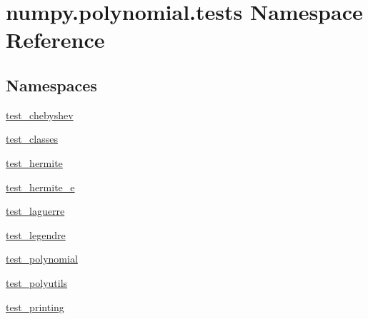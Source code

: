 \hypertarget{namespacenumpy_1_1polynomial_1_1tests}{}\section{numpy.\+polynomial.\+tests Namespace Reference}
\label{namespacenumpy_1_1polynomial_1_1tests}
\subsection*{Namespaces}
\begin{DoxyCompactItemize}
\item 
 \hyperlink{namespacenumpy_1_1polynomial_1_1tests_1_1test__chebyshev}{test\+\_\+chebyshev}
\item 
 \hyperlink{namespacenumpy_1_1polynomial_1_1tests_1_1test__classes}{test\+\_\+classes}
\item 
 \hyperlink{namespacenumpy_1_1polynomial_1_1tests_1_1test__hermite}{test\+\_\+hermite}
\item 
 \hyperlink{namespacenumpy_1_1polynomial_1_1tests_1_1test__hermite__e}{test\+\_\+hermite\+\_\+e}
\item 
 \hyperlink{namespacenumpy_1_1polynomial_1_1tests_1_1test__laguerre}{test\+\_\+laguerre}
\item 
 \hyperlink{namespacenumpy_1_1polynomial_1_1tests_1_1test__legendre}{test\+\_\+legendre}
\item 
 \hyperlink{namespacenumpy_1_1polynomial_1_1tests_1_1test__polynomial}{test\+\_\+polynomial}
\item 
 \hyperlink{namespacenumpy_1_1polynomial_1_1tests_1_1test__polyutils}{test\+\_\+polyutils}
\item 
 \hyperlink{namespacenumpy_1_1polynomial_1_1tests_1_1test__printing}{test\+\_\+printing}
\end{DoxyCompactItemize}
